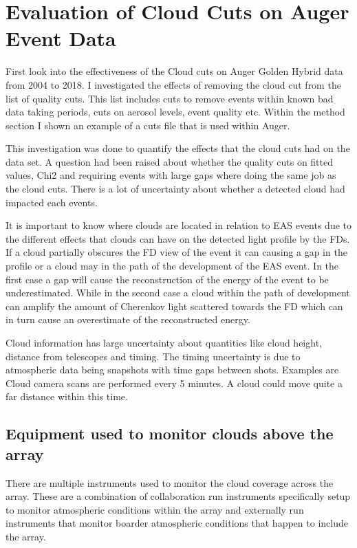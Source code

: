 \chapter[Evaluation of Cloud Cuts on Auger Event Data]{\centering Evaluation of Cloud Cuts on Auger Event Data \\}\label{Ch:CloudCuts}

First look into the effectiveness of the Cloud cuts on Auger Golden Hybrid data from 2004 to 2018.
I investigated the effects of removing the cloud cut from the list of quality cuts. This list includes cuts to remove events within known bad data taking periods, cuts on aerosol levels, event quality etc. Within the method section I shown an example of a cuts file that is used within Auger.

This investigation was done to quantify the effects that the cloud cuts had on the data set. A question had been raised about whether the quality cuts on fitted values, Chi2 and requiring events with large gaps where doing the same job as the cloud cuts. There is a lot of uncertainty about whether a detected cloud had impacted each events.

It is important to know where clouds are located in relation to EAS events due to the different effects that clouds can have on the detected light profile by the FDs. If a cloud partially obscures the FD view of the event it can causing a gap in the profile or a cloud may in the path of the development of the EAS event. In the first case a gap will cause the reconstruction of the energy of the event to be underestimated. While in the second case a cloud within the path of development can amplify the amount of Cherenkov light scattered towards the FD which can in turn cause an overestimate of the reconstructed energy.

Cloud information has large uncertainty about quantities like cloud height, distance from telescopes and timing. The timing uncertainty is due to atmospheric data being snapshots with time gaps between shots. Examples are Cloud camera scans are performed every 5 minutes. A cloud could move quite a far distance within this time.

\section{Equipment used to monitor clouds above the array}

There are multiple instruments used to monitor the cloud coverage across the array. These are a combination of collaboration run instruments specifically setup to monitor atmospheric conditions within the array and externally run instruments that monitor boarder atmospheric conditions that happen to include the array. 

